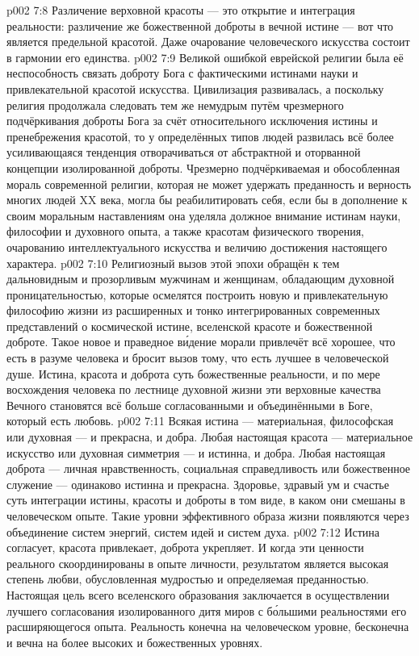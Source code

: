 \vs p002 7:8 \pc Различение верховной красоты --- это открытие и интеграция реальности: различение же божественной доброты в вечной истине --- вот что является предельной красотой. Даже очарование человеческого искусства состоит в гармонии его единства.
\vs p002 7:9 Великой ошибкой еврейской религии была её неспособность связать доброту Бога с фактическими истинами науки и привлекательной красотой искусства. Цивилизация развивалась, а поскольку религия продолжала следовать тем же немудрым путём чрезмерного подчёркивания доброты Бога за счёт относительного исключения истины и пренебрежения красотой, то у определённых типов людей развилась всё более усиливающаяся тенденция отворачиваться от абстрактной и оторванной концепции изолированной доброты. Чрезмерно подчёркиваемая и обособленная мораль современной религии, которая не может удержать преданность и верность многих людей XX века, могла бы реабилитировать себя, если бы в дополнение к своим моральным наставлениям она уделяла должное внимание истинам науки, философии и духовного опыта, а также красотам физического творения, очарованию интеллектуального искусства и величию достижения настоящего характера.
\vs p002 7:10 Религиозный вызов этой эпохи обращён к тем дальновидным и прозорливым мужчинам и женщинам, обладающим духовной проницательностью, которые осмелятся построить новую и привлекательную философию жизни из расширенных и тонко интегрированных современных представлений о космической истине, вселенской красоте и божественной доброте. Такое новое и праведное в\'идение морали привлечёт всё хорошее, что есть в разуме человека и бросит вызов тому, что есть лучшее в человеческой душе. Истина, красота и доброта суть божественные реальности, и по мере восхождения человека по лестнице духовной жизни эти верховные качества Вечного становятся всё больше согласованными и объединёнными в Боге, который есть любовь.
\vs p002 7:11 \pc Всякая истина --- материальная, философская или духовная --- и прекрасна, и добра. Любая настоящая красота --- материальное искусство или духовная симметрия --- и истинна, и добра. Любая настоящая доброта --- личная нравственность, социальная справедливость или божественное служение --- одинаково истинна и прекрасна. Здоровье, здравый ум и счастье суть интеграции истины, красоты и доброты в том виде, в каком они смешаны в человеческом опыте. Такие уровни эффективного образа жизни появляются через объединение систем энергий, систем идей и систем духа.
\vs p002 7:12 Истина согласует, красота привлекает, доброта укрепляет. И когда эти ценности реального скоординированы в опыте личности, результатом является высокая степень любви, обусловленная мудростью и определяемая преданностью. Настоящая цель всего вселенского образования заключается в осуществлении лучшего согласования изолированного дитя миров с б\'ольшими реальностями его расширяющегося опыта. Реальность конечна на человеческом уровне, бесконечна и вечна на более высоких и божественных уровнях.
